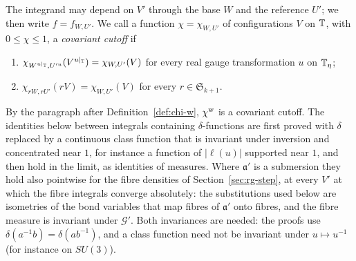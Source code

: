 The integrand may depend on $V'$ through the base $W$ and the reference $U'$; we then write $f=f_{W,U'}$. We call a function $\chi=\chi_{W,U'}$ of configurations $V$ on $\mathbb T$, with $0\le\chi\le1$, a \emph{covariant cutoff} if
\begin{enumerate}[label=(C\arabic*)]
\item $\chi_{W^{u|_\mathbb T},U'^u}(V^{u|_\mathbb T})=\chi_{W,U'}(V)$ for every real gauge transformation $u$ on $\mathbb T_\eta$;
\item $\chi_{rW,rU'}(rV)=\chi_{W,U'}(V)$ for every $r\in\mathfrak S_{k+1}$.
\end{enumerate}
By the paragraph after Definition~\ref{def:chi-w}, $\chi^{\rm w}$ is a covariant cutoff. The identities below between integrals containing $\delta$-functions are first proved with $\delta$ replaced by a continuous class function that is invariant under inversion and concentrated near $1$, for instance a function of $|\ell(u)|$ supported near $1$, and then hold in the limit, as identities of measures. Where $\mathfrak a'$ is a submersion they hold also pointwise for the fibre densities of Section~\ref{sec:rg-step}, at every $V'$ at which the fibre integrals converge absolutely: the substitutions used below are isometries of the bond variables that map fibres of $\mathfrak a'$ onto fibres, and the fibre measure is invariant under $\mathcal G'$. Both invariances are needed: the proofs use $\delta(a^{-1}b)=\delta(ab^{-1})$, and a class function need not be invariant under $u\mapsto u^{-1}$ (for instance on $SU(3)$).

